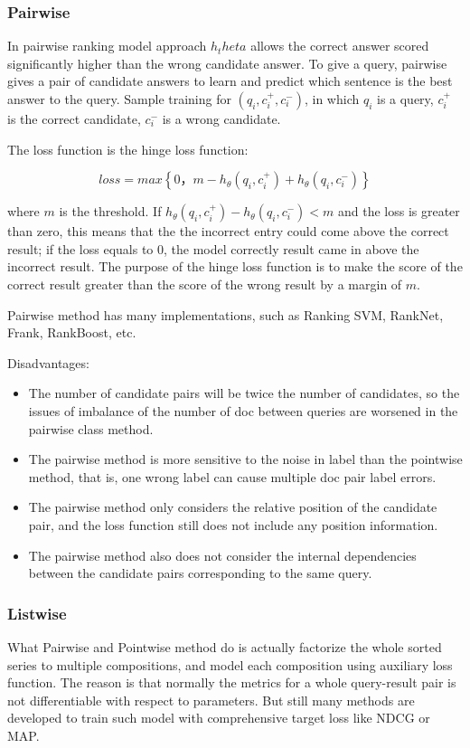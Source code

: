 \documentclass[runningheads]{llncs}
\begin{document}
\subsubsection{Pairwise}

In pairwise ranking model approach $h_theta$ allows the correct answer scored significantly higher than the wrong candidate answer. To give a query, pairwise gives a pair of candidate answers to learn and predict which sentence is the best answer to the query. Sample training for $(q_i, c^+_ i, c^−_i)$, in which $q_i$ is a query, $c^+_i$ is the correct candidate, $c^-_i$ is a wrong candidate.

The loss function is the hinge loss function:

\begin{equation}
    loss=max\left\{ 0，m-h_\theta(q_i,c^+_i)+h_\theta(q_i,c^-_i)\right\}
\end{equation}

where $m$ is the threshold.
If $h_θ(q_i, c^+ _i)−h_θ(q_i, c^−_i) < m$ and the loss is greater than zero, this means that the the incorrect entry could come above the correct result; if the loss equals to 0, the model correctly result came in above the incorrect result. The purpose of the hinge loss function is to make the score of the correct result greater than the score of the wrong result by a margin of $m$.

Pairwise method has many implementations, such as Ranking SVM, RankNet, Frank, RankBoost, etc.

Disadvantages:
\begin{itemize}
    \item The number of candidate pairs will be twice the number of candidates, so the issues of imbalance of the number of doc between queries are worsened in the pairwise class method.
    \item The pairwise method is more sensitive to the noise in label than the pointwise method, that is, one wrong label can cause multiple doc pair label errors.
    \item The pairwise method only considers the relative position of the candidate pair, and the loss function still does not include any position information.
    \item The pairwise method also does not consider the internal dependencies between the candidate pairs corresponding to the same query.
\end{itemize}

\subsubsection{Listwise}
What Pairwise and Pointwise method do is actually factorize the whole sorted series to multiple compositions, and model each composition using auxiliary loss function. The reason is that normally the metrics for a whole query-result pair is not differentiable with respect to parameters. But still many methods are developed to train such model with comprehensive target loss like NDCG or MAP.
\end{document}

